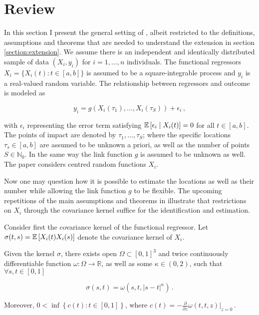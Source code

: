 \section{Review}
\label{section:review}

In this section I present the general setting of \cite{Kneip2020}, albeit restricted to
the definitions, assumptions and theorems that are needed to understand the extension in
section \ref{section:extension}. We assume there is an independent and identically
distributed sample of data $(X_i, y_i)$ for $i=1,\dots,n$ individuals. The functional
regressors $X_i = \{ X_i(t) : t \in [a, b] \}$ is assumed to be a square-integrable
process and $y_i$ is a real-valued random variable. The relationship between regressors
and outcome is modeled as

\[
    y_i = g \left( X_i(\tau_1), \dots, X_i(\tau_S) \right) + \epsilon_i \,,
\]

with $\epsilon_i$ representing the error term satisfying $\mathbb{E}\left[\epsilon_i \mid
X_i(t)\right] = 0$ for all $t \in [a, b]$. The points of impact are denoted by $\tau_1, \dots,
\tau_S$; where the specific locations $\tau_s \in [a, b]$ are assumed to be unknown a
priori, as well as the number of points $S \in \mathbb{N}_0$. In the same way the link
function $g$ is assumed to be unknown as well. The paper considers centred random
functions $X_i$.

Now one may question how it is possible to estimate the locations as well as their
number while allowing the link function $g$ to be flexible. The upcoming repetitions of
the main assumptions and theorems in \cite{Kneip2020} illustrate that restrictions on
$X_i$ through the covariance kernel suffice for the identification and estimation.

Consider first the covariance kernel of the functional regressor. Let $\sigma(t, s) =
\mathbb{E}\left[X_i(t) X_i(s)\right]$ denote the covariance kernel of $X_i$.


\begin{assumption}
    Given the kernel $\sigma$, there exists open $\Omega \subset [0, 1]^3$ and twice
    continuously differentiable function $\omega : \Omega \to \mathbb{R}$, as well as
    some $\kappa \in (0, 2)$, such that $\forall s, t \in [0, 1]$

    \[
        \sigma(s, t) = \omega(s, t, |s-t|^{\kappa}) \,.
    \]

    Moreover, $0 < \inf \left\{ c(t) : t \in [0, 1] \right\}$, where $c(t) =
    -\frac{\partial}{\partial z} \omega(t, t, z)|_{z = 0} \,.$
\label{assumption:1}
\end{assumption}

